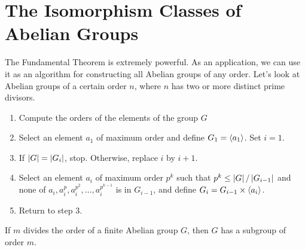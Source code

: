 \section{The Isomorphism Classes of Abelian Groups}

\begin{remark}
	The Fundamental Theorem is extremely powerful. As an application, we can use it as an algorithm for constructing all Abelian groups of any order. Let's look at Abelian groups of a certain order $n$, where $n$ has two or more distinct prime divisors.
	\begin{enumerate}
		\item Compute the orders of the elements of the group $G$
		\item Select an element $a_1$ of maximum order and define $G_1 = \langle a_1 \rangle$. Set $i = 1$.
		\item If $\left\lvert G \right\rvert = \left\lvert G_i \right\rvert$, stop. Otherwise, replace $i$ by $i + 1$.
		\item Select an element $a_i$ of maximum order $p^k$ such that $p^k \leq \left\lvert G \right\rvert/\left\lvert G_{i-1} \right\rvert$ and none of $a_i, a^p_i,a^{p^2}_i, \dots, a^{p^{k-1}}_i$ is in $G_{i-1}$, and define $G_i=G_{i-1} \times \langle a_i \rangle$.
		\item Return to step 3.
	\end{enumerate}
\end{remark}

\begin{corollary}
	If $m$ divides the order of a finite Abelian group $G$, then $G$ has a subgroup of order $m$.
\end{corollary}
